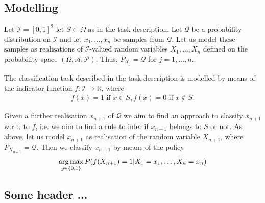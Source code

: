 \subsection{Modelling}

	Let $\mathcal{I}=[0, 1]^{2}$ let $S\subset\Omega$ as in the task description. Let $\mathcal{Q}$ be a probability distribution on 
	$\mathcal{I}$ and let $x_{1}, \ldots, x_{n}$ be samples from $\mathcal{Q}$. Let us model these samples as realisations of 
	$\mathcal{I}$-valued random variables $X_{1}, \ldots, X_{n}$ defined on the probability space 
	$(\Omega, \mathcal{A}, \mathcal{P})$. Thus, $P_{X_{j}} = \mathcal{Q}$ for $j = 1, \ldots, n$.
	
	The classification task described in the task description is modelled by means of the indicator function 
	$f:\mathcal{I}\rightarrow\mathbb{R}$, where
	\begin{align*}
		f(x) = 1 \text{ if } x\in S, f(x) = 0 \text{ if } x\notin S.
	\end{align*}
	
	Given a further realisation $x_{n + 1}$ of $\mathcal{Q}$ we aim to find an approach to classify $x_{n + 1}$ w.r.t. to 
	$f$, i.e. we aim to find a rule to infer if $x_{n + 1}$ belongs to $S$ or not. As above, let us model $x_{n + 1}$ as realisation 
	of the random variable $X_{n + 1}$, where $P_{X_{n + 1}} = \mathcal{Q}$. Then we classify $x_{n + 1}$ by means of the policy
	\begin{align}\label{eq:dec_rule}
		\operatorname*{arg\,max}_{y\in\{0, 1\}} P(f(X_{n + 1}) = 1 | X_{1} = x_{1}, \ldots, X_{n} = x_{n}) 
	\end{align}
	
	
\subsection{Some header ...}
		
